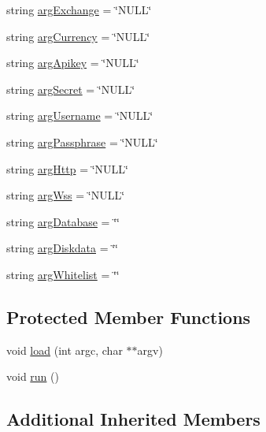 \begin{DoxyCompactItemize}
\item 
string \hyperlink{class_k_1_1_c_f_ac2c90c943260d1f24bb92efa33e2f7ff}{arg\+Exchange} = \char`\"{}N\+U\+LL\char`\"{}
\item 
string \hyperlink{class_k_1_1_c_f_a8c9947131171d2d20bc1ea5b3423a395}{arg\+Currency} = \char`\"{}N\+U\+LL\char`\"{}
\item 
string \hyperlink{class_k_1_1_c_f_a88cf02a0929b4bc9d403c64fc0635d8e}{arg\+Apikey} = \char`\"{}N\+U\+LL\char`\"{}
\item 
string \hyperlink{class_k_1_1_c_f_a7f00f6255755b37220ad45131ae0ad28}{arg\+Secret} = \char`\"{}N\+U\+LL\char`\"{}
\item 
string \hyperlink{class_k_1_1_c_f_a330672ad82dc3b07df05e5515d1bc0c1}{arg\+Username} = \char`\"{}N\+U\+LL\char`\"{}
\item 
string \hyperlink{class_k_1_1_c_f_aab55dec94bd05605b7931510960734b6}{arg\+Passphrase} = \char`\"{}N\+U\+LL\char`\"{}
\item 
string \hyperlink{class_k_1_1_c_f_aa00ec893e8f2756c08b219b8ef6ccad8}{arg\+Http} = \char`\"{}N\+U\+LL\char`\"{}
\item 
string \hyperlink{class_k_1_1_c_f_ab6402172f1adc2b82968e480816c5df8}{arg\+Wss} = \char`\"{}N\+U\+LL\char`\"{}
\item 
string \hyperlink{class_k_1_1_c_f_a1554afb0c30eb312e1b19b476b9bed36}{arg\+Database} = \char`\"{}\char`\"{}
\item 
string \hyperlink{class_k_1_1_c_f_a82308ee2afc2d7517b4067a23e783b49}{arg\+Diskdata} = \char`\"{}\char`\"{}
\item 
string \hyperlink{class_k_1_1_c_f_a007fd80e3d8d6bc1f57ce7fb36e6f7e7}{arg\+Whitelist} = \char`\"{}\char`\"{}
\end{DoxyCompactItemize}
\subsection*{Protected Member Functions}
\begin{DoxyCompactItemize}
\item 
void \hyperlink{class_k_1_1_c_f_aa7590ffe947041a741bb86945e1aa572}{load} (int argc, char $\ast$$\ast$argv)
\item 
void \hyperlink{class_k_1_1_c_f_a13a43e6d814de94978c515cb084873b1}{run} ()
\end{DoxyCompactItemize}
\subsection*{Additional Inherited Members}


